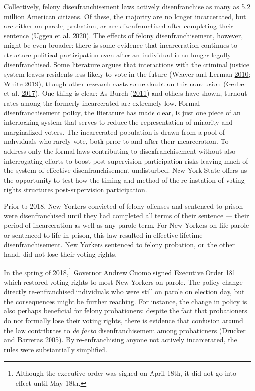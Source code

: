 \documentclass[
  12pt,
]{article}
\begin{document}
Collectively, felony disenfranchisement laws actively disenfranchise as many as 5.2 million American citizens. Of these, the majority are no longer incarcerated, but are either on parole, probation, or are disenfranchised after completing their sentence (Uggen et al. \protect\hyperlink{ref-Uggen2020}{2020}). The effects of felony disenfranchisement, however, might be even broader: there is some evidence that incarceration continues to structure political participation even after an individual is no longer legally disenfranchised. Some literature argues that interactions with the criminal justice system leaves residents less likely to vote in the future (Weaver and Lerman \protect\hyperlink{ref-Weaver2010}{2010}; White \protect\hyperlink{ref-White2019}{2019}), though other research casts some doubt on this conclusion (Gerber et al. \protect\hyperlink{ref-Gerber2017}{2017}). One thing is clear: As Burch (\protect\hyperlink{ref-Burch2011}{2011}) and others have shown, turnout rates among the formerly incarcerated are extremely low. Formal disenfranchisement policy, the literature has made clear, is just one piece of an interlocking system that serves to reduce the representation of minority and marginalized voters. The incarcerated population is drawn from a pool of individuals who rarely vote, both prior to and after their incarceration. To address only the formal laws contributing to disenfranchisement without also interrogating efforts to boost post-supervision participation risks leaving much of the system of effective disenfranchisement undisturbed. New York State offers us the opportunity to test how the timing and method of the re-instation of voting rights structures post-supervision participation.

Prior to 2018, New Yorkers convicted of felony offenses and sentenced to prison were disenfranchised until they had completed all terms of their sentence --- their period of incarceration as well as any parole term. For New Yorkers on life parole or sentenced to life in prison, this law resulted in effective lifetime disenfranchisement. New Yorkers sentenced to felony probation, on the other hand, did not lose their voting rights.

In the spring of 2018,\footnote{Although the executive order was signed on April 18th, it did not go into effect until May 18th.} Governor Andrew Cuomo signed Executive Order 181 which restored voting rights to most New Yorkers on parole. The policy change directly re-enfranchised individuals who were still on parole on election day, but the consequences might be further reaching. For instance, the change in policy is also perhaps beneficial for felony probationers: despite the fact that probationers do not formally lose their voting rights, there is evidence that confusion around the law contributes to \emph{de facto} disenfranchisement among probationers (Drucker and Barreras \protect\hyperlink{ref-Drucker2005}{2005}). By re-enfranchising anyone not actively incarcerated, the rules were substantially simplified.
\end{document}

